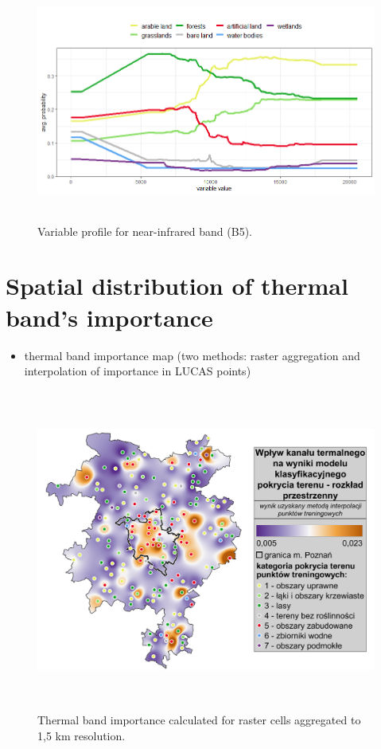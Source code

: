 \documentclass{amuthesis}
\begin{document}
\begin{figure}[t]

{\centering \includegraphics[width=5.90625in,height=3.125in]{./figures/profB5.png}

}

\caption{\label{fig-rycina16}Variable profile for near-infrared band
(B5).}

\end{figure}

\hypertarget{sec-imp-spat}{%
\section{Spatial distribution of thermal band's
importance}\label{sec-imp-spat}}

\begin{itemize}
\tightlist
\item
  thermal band importance map (two methods: raster aggregation and
  interpolation of importance in LUCAS points)
\end{itemize}

\begin{figure}[t]

{\centering \includegraphics[width=5.875in,height=4.16667in]{./figures/B10_importance-spatial.png}

}

\caption{\label{fig-rycina17}Thermal band importance calculated for
raster cells aggregated to 1,5 km resolution.}

\end{figure}
\end{document}
